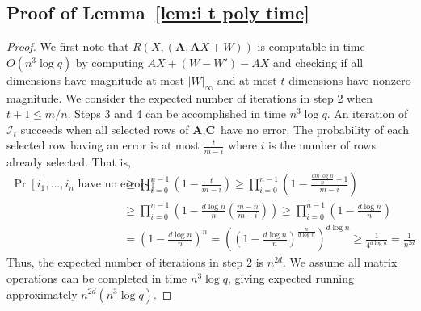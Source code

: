 \documentclass[11pt]{article}
\newcommand{\lemref}[1]{\mbox{Lemma~\ref{#1}}}
\newcommand{\vect}[1]{\ensuremath{\textbf{#1}}}
\newcommand{\vA}{\vect{A}}
\begin{document}

\subsection{Proof of \lemref{lem:i t poly time}}
\label{sec:proof lem i t poly time}
\begin{proof}
We first note that $R(X, (\vA, \vA X+W))$ is computable in time $O(n^3\log q)$ by computing $AX+(W-W')- AX$ and checking if all dimensions have magnitude at most $|W|_\infty$ and at most $t$ dimensions have nonzero magnitude. We consider the expected number of iterations in step 2 when $t+1\leq m/n$.  Steps 3 and 4 can be accomplished in time $n^3\log q $.  An iteration of $\mathcal{I}_t$ succeeds when all selected rows of $\vA, \vect{C}$ have no error.  The probability of each selected row having an error is at most $\frac{t}{m - i}$ where $i$ is the number of rows already selected.  That is,
\begin{align*}
\Pr[i_1,..., i_n\text{ have no errors}]&\geq \prod_{i=0}^{n-1}\left(1 - \frac{t}{m-i}\right)\geq \prod_{i=0}^{n-1}\left( 1-\frac{\frac{dm\log n}{n}-1}{m-i}\right)\\
&\geq  \prod_{i=0}^{n-1}\left( 1-\frac{d\log n}{n}\left(\frac{m-n}{m-i}\right)\right)\geq \prod_{i=0}^{n-1}\left( 1-\frac{d\log n}{n}\right) \\
&= \left(1-\frac{d\log n}{n}\right)^n  = \left(\left(1-\frac{d\log n}{n}\right)^{\frac{n}{d\log n}}\right)^{d\log n}\geq \frac{1}{4^{d\log n}} = \frac{1}{n^{2d}}
\end{align*}
Thus, the expected number of iterations in step 2 is $n^{2d}$.  We assume all matrix operations can be completed in time $n^3\log q$, giving expected running approximately $n^{2d}(n^3 \log q)$.
\end{proof}
\end{document}
